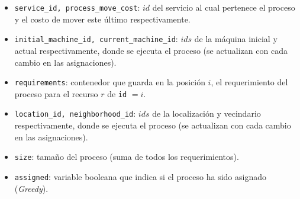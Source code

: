 \documentclass[../informe2.tex]{subfiles}
\begin{document}
\noindent\begin{minipage}{0.3\textwidth}
\end{minipage}\hfill
\begin{minipage}{0.6\textwidth}
	\small
	\begin{itemize}[leftmargin=*]
		\item \texttt{service\_id, process\_move\_cost}: $id$ del servicio al cual pertenece el proceso y el costo de mover este último respectivamente.
		\item \texttt{initial\_machine\_id, current\_machine\_id}: $ids$ de la máquina inicial y actual respectivamente, donde se ejecuta el proceso (se actualizan con cada cambio en las asignaciones).
		\item \texttt{requirements}: contenedor que guarda en la posición $i$, el requerimiento del proceso para el recurso $r$ de \texttt{id} $=i$.
		\item \texttt{location\_id, neighborhood\_id}: $ids$ de la localización y vecindario respectivamente, donde se ejecuta el proceso (se actualizan con cada cambio en las asignaciones).
		\item \texttt{size}: tamaño del proceso (suma de todos los requerimientos).
		\item \texttt{assigned}: variable booleana que indica si el proceso ha sido asignado (\textit{Greedy}).
	\end{itemize}
\end{minipage}

\bigskip
\end{document}

